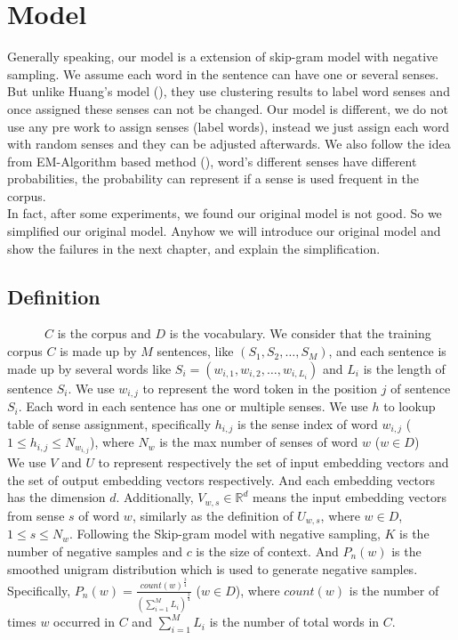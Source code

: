 \chapter{Model}
\label{cha:modeli}

Generally speaking, our model is a extension of skip-gram model with negative sampling. We assume each word in the sentence can have one or several senses. But unlike Huang's model (\cite{huang2012improving}), they use clustering results to label word senses and once assigned these senses can not be changed. Our model is different, we do not use any pre work to assign senses (label words), instead we just assign each word with random senses and they can be adjusted afterwards. We also follow the idea from EM-Algorithm based method (\citep{tian2014probabilistic}), word's different senses have different probabilities, the probability can represent if a sense is used frequent in the corpus. \\

In fact, after some experiments, we found our original model is not good. So we simplified our original model. Anyhow we will introduce our original model and show the failures in the next chapter, and explain the simplification. 

\section{Definition}

\ \ \ \ \ \ $C$ is the corpus and $D$ is the vocabulary. We consider that the training corpus $C$ is made up by $M$ sentences, like $(S_1,S_2,\ldots,S_M)$, and each sentence is made up by several words like $S_i = (w_{i,1},w_{i,2},\ldots,w_{i,L_i})$ and $L_i$ is the length of sentence $S_i$. We use $w_{i,j}$ to represent the word token in the position $j$ of sentence $S_i$. Each word in each sentence has one or multiple senses. We use $h$ to lookup table of sense assignment, specifically $h_{i,j}$ is the sense index of word $w_{i,j}$  ($1\leq h_{i,j}\leq N_{w_{i,j}}$), where $N_w$ is the max number of senses of word $w$ ($w\in D$)\\

We use $V$ and $U$ to represent respectively the set of input embedding vectors and the set of output embedding vectors respectively. And each embedding vectors has the dimension $d$. Additionally, $V_{w,s} \in \mathbb{R}^d$ means the input embedding vectors from sense $s$ of word $w$, similarly as the definition of $U_{w,s}$, where  $w\in D$, $1\leq s\leq N_w$. Following the Skip-gram model with negative sampling, $K$ is the number of negative samples and $c$ is the size of context. And $P_n(w)$ is the smoothed unigram distribution which is used to generate negative samples. Specifically, $P_n(w) = \frac{count(w)^{\frac{3}{4}}}{(\sum_{i=1}^M L_i)^{\frac{3}{4}}}$ ($w\in D$), where $count(w)$ is the number of times $w$ occurred in $C$ and $\sum_{i=1}^M L_i$ is the number of total words in $C$.

